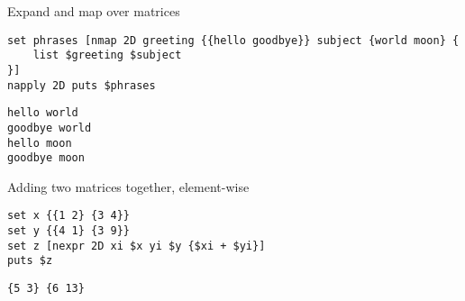 \documentclass{article}
\begin{document}
\begin{example}{Expand and map over matrices}
\begin{lstlisting}
set phrases [nmap 2D greeting {{hello goodbye}} subject {world moon} {
    list $greeting $subject
}]
napply 2D puts $phrases
\end{lstlisting}
\tcblower
\begin{lstlisting}
hello world
goodbye world
hello moon
goodbye moon
\end{lstlisting}
\end{example}

\begin{example}{Adding two matrices together, element-wise}
\begin{lstlisting}
set x {{1 2} {3 4}}
set y {{4 1} {3 9}}
set z [nexpr 2D xi $x yi $y {$xi + $yi}]
puts $z
\end{lstlisting}
\tcblower
\begin{lstlisting}
{5 3} {6 13}
\end{lstlisting}
\end{example}




{\normalsize\printindex}
\end{document}
